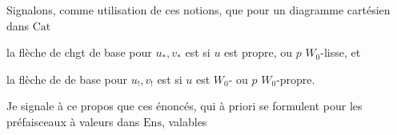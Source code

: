 Signalons, comme  utilisation de ces notions, que pour un diagramme cartésien dans $\mathrm{Cat}$


la flèche de chgt de base pour $u_*,v_*$  est  si $u$ est propre, ou $p$ $W_0$-lisse, et

la flèche de  de base pour $u_!,v_!$ est  si $u$ est $W_0$- ou $p$ $W_0$-propre.


Je signale à ce propos que ces énoncés, qui à priori se  formulent pour les préfaisceaux à valeurs dans $\mathrm{Ens}$,  valables
